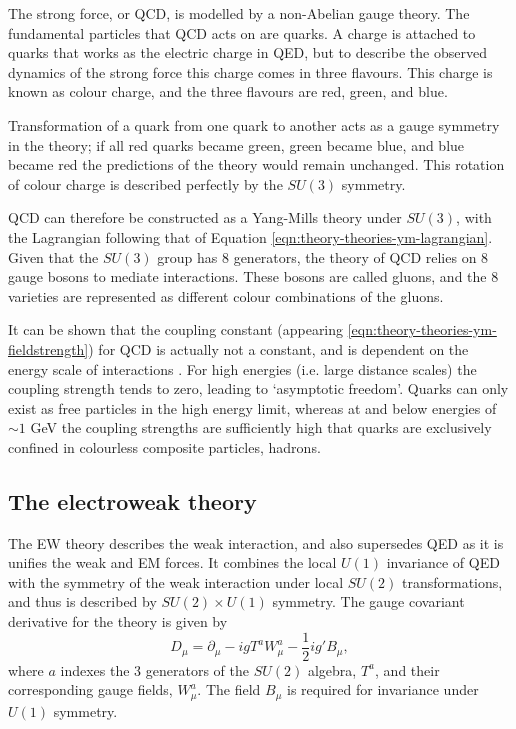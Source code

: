 The strong force, or \ac{QCD}, is modelled by a non-Abelian gauge theory. The
fundamental particles that \ac{QCD} acts on are quarks.
A charge is attached to quarks that works as the electric charge in \ac{QED},
but to describe the observed dynamics of the strong force this charge comes in
three flavours. This charge is known as colour charge, and the three flavours
are red, green, and blue.

Transformation of a quark from one quark to another acts as a gauge symmetry in
the theory; if all red quarks became green, green became blue, and blue became
red the predictions of the theory would remain unchanged. This rotation of
colour charge is described perfectly by the $SU(3)$ symmetry.

\ac{QCD} can therefore be constructed as a Yang-Mills theory under $SU(3)$,
with the Lagrangian following that of Equation
\ref{eqn:theory-theories-ym-lagrangian}. Given that the $SU(3)$ group has 8
generators, the theory of \ac{QCD} relies on 8 gauge bosons to mediate
interactions. These bosons are called gluons, and the 8 varieties are
represented as different colour combinations of the gluons.

It can be shown that the coupling constant (appearing
\ref{eqn:theory-theories-ym-fieldstrength}) for \ac{QCD} is actually not a
constant, and is dependent on the energy scale of interactions \cite{PDG2022}.
For high energies (i.e. large distance scales) the coupling strength tends to
zero, leading to `asymptotic freedom'. Quarks can only exist as free particles
in the high energy limit, whereas at and below energies of $\sim1$ GeV the
coupling strengths are sufficiently high that quarks are exclusively confined in
colourless composite particles, hadrons.


\subsection{The electroweak theory}
\label{sec:theory-theories-ew}

The \ac{EW} theory describes the weak interaction, and also supersedes \ac{QED}
as it is unifies the weak and \ac{EM} forces.  It combines the local $U(1)$
invariance of \ac{QED} with the symmetry of the weak interaction under local
$SU(2)$ transformations, and thus is described by $SU(2)\times U(1)$ symmetry.
The gauge covariant derivative for the theory is given by
%
\begin{equation*}
  D_\mu = \partial_\mu - igT^a W^a_\mu - \frac12 ig'B_\mu,
\end{equation*}
where $a$ indexes the 3 generators of the $SU(2)$ algebra, $T^a$, and their
corresponding gauge fields, $W^a_\mu$. The field $B_\mu$ is required for
invariance under $U(1)$ symmetry.


